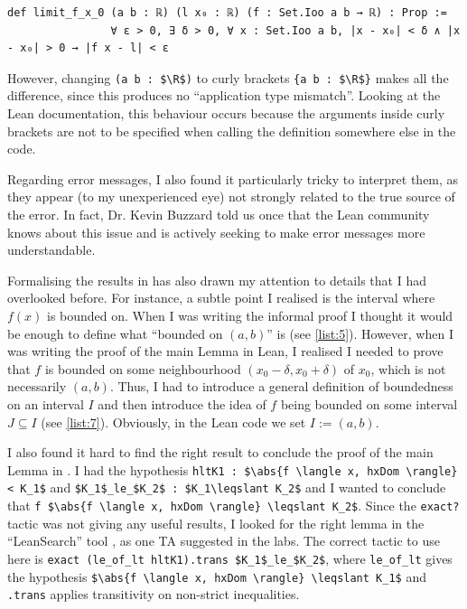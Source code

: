 \documentclass[a4paper,11pt]{article}
\theoremstyle{plain}
\newcommand{\R}{\ensuremath{\mathbb{R}}} %
\begin{document}
		\begin{lstlisting}[caption={(Incorrect) definition of limit at $x_0$.}]
			def limit_f_x_0 (a b : ℝ) (l x₀ : ℝ) (f : Set.Ioo a b → ℝ) : Prop :=
				∀ ε > 0, ∃ δ > 0, ∀ x : Set.Ioo a b, |x - x₀| < δ ∧ |x - x₀| > 0 → |f x - l| < ε
		\end{lstlisting}
		
		However, changing \lstinline|(a b : $\R$)| to curly brackets \lstinline|{a b : $\R$}| makes all the difference, since this produces no ``application type mismatch''. Looking at the Lean documentation, this behaviour occurs because the arguments inside curly brackets are not to be specified when calling the definition somewhere else in the code.
		
		Regarding error messages, I also found it particularly tricky to interpret them, as they appear (to my unexperienced eye) not strongly related to the true source of the error. In fact, Dr. Kevin Buzzard told us once that the Lean community knows about this issue and is actively seeking to make error messages more understandable.
		
		Formalising the results in  has also drawn my attention to details that I had overlooked before. For instance, a subtle point I realised is the interval where $f(x)$ is bounded on. When I was writing the informal proof I thought it would be enough to define what ``bounded on $(a,b)$'' is (see \cref{list:5}). However, when I was writing the proof of the main Lemma in Lean, I realised I needed to prove that $f$ is bounded on some neighbourhood $(x_0-\delta, x_0+\delta)$ of $x_0$, which is not necessarily $(a,b)$. Thus, I had to introduce a general definition of boundedness on an interval $I$ and then introduce the idea of $f$ being bounded on some interval $J\subseteq I$ (see \cref{list:7}). Obviously, in the Lean code we set $I:=(a,b)$.
		
		I also found it hard to find the right result to conclude the proof of the main Lemma in . I had the hypothesis \lstinline|hltK1 : $\abs{f \langle x, hxDom \rangle} < K_1$| and \lstinline|$K_1$_le_$K_2$ : $K_1\leqslant K_2$| and I wanted to conclude that \lstinline|f $\abs{f \langle x, hxDom \rangle} \leqslant K_2$|. Since the \lstinline|exact?| tactic was not giving any useful results, I looked for the right lemma in the ``LeanSearch'' tool \cite{LeanSearch}, as one TA suggested in the labs. The correct tactic to use here is \lstinline|exact (le_of_lt hltK1).trans $K_1$_le_$K_2$|, where \lstinline|le_of_lt| gives the hypothesis \lstinline|$\abs{f \langle x, hxDom \rangle} \leqslant K_1$| and \lstinline|.trans| applies transitivity on non-strict inequalities.
		
\end{document}
